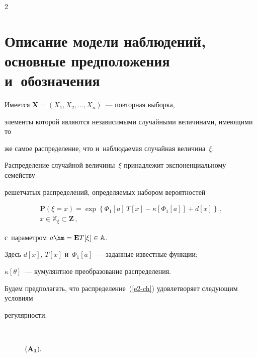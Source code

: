 \begin{multicols}{2}
\section{Описание модели наблюдений, основные предположения и~обозначения}





\vspace*{-2pt}








   Имеется $\mathbf{X}=\left(X_1,X_2,\ldots,X_n\right)$~--- повторная выборка,


  элементы которой являются независимыми случайными величинами, имеющими то 


  же самое распределение, что и~наблюдаемая случайная величина~$\xi$.





   Распределение случайной величины~$\xi$ принадлежит экспоненциальному семейству


  решетчатых распределений, определяемых набором вероятностей


  \begin{multline}


   \mathbf{P}(\xi=x) =


    \exp \left\{ \Phi_1[a] \, T[x] -\kappa[\Phi_1[a]]+ d[x ]\right\}\,,\\


   x\in {\mathbb X}_\xi\subset \mathbf{Z}\,,


   \label{e2-ch}


  \end{multline}


  с~параметром $a \hm= \mbox {\bf E} T[\xi]\in {\mathbb A}$.


  Здесь $d[x]$,  $T[x]$ и~$\Phi_1[a]$~--- заданные известные функции;


  $\kappa[\theta]$~--- кумулянтное преобразование распределения.





   Будем предполагать, что распределение~(\ref{e2-ch}) удовле\-тво\-ря\-ет следующим условиям


  регулярности.


  \begin{description}


  \item[\,] $\bf (A_1).$



\end{description}
\end{multicols}
